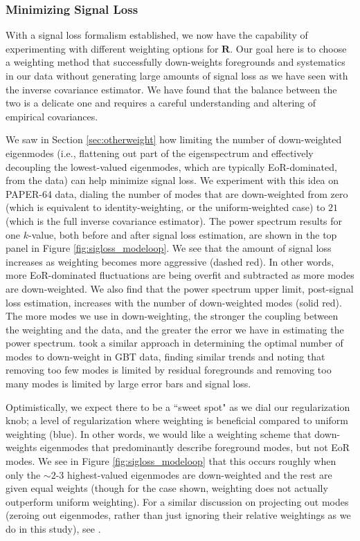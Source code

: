 \documentclass[preprint2,numberedappendix,tighten]{aastex6}  %
\begin{document}
\subsubsection{Minimizing Signal Loss}
\label{sec:Weight}

With a signal loss formalism established, we now have the capability of experimenting 
with different weighting options for $\textbf{R}$. Our goal here is to choose a weighting method that successfully down-weights 
foregrounds and systematics in our data without generating large amounts of signal loss as we have seen with the inverse covariance estimator. We have found that the balance 
between the two is a delicate one and requires a careful understanding and altering of empirical covariances. 

We saw in Section \ref{sec:otherweight} how limiting the number of down-weighted eigenmodes (i.e., flattening out part of the 
eigenspectrum and effectively decoupling the lowest-valued eigenmodes, which are typically EoR-dominated, from the data) can help minimize signal loss. We experiment with this idea on PAPER-64 data, dialing the number of modes 
that are down-weighted from zero (which is equivalent to identity-weighting, or the uniform-weighted case) to $21$ (which is the full inverse 
covariance estimator). The power spectrum results for one $k$-value, both before and after signal loss 
estimation, are shown in the top panel in Figure \ref{fig:sigloss_modeloop}. We see that the amount of signal loss increases as weighting 
becomes more aggressive (dashed red). In other words, more EoR-dominated fluctuations are being overfit and 
subtracted as more modes are down-weighted. We also find that the power spectrum upper limit, post-signal loss estimation, 
increases with the number of down-weighted modes (solid red). The more modes we use in down-weighting, the stronger the coupling between the weighting and the data, and the greater the error we have in estimating the power spectrum. \citet{switzer_et_al2013} took a similar approach in determining the optimal number of modes to down-weight in GBT data, finding similar trends and noting that removing too few modes is limited by residual foregrounds and removing too many modes is limited by large error bars and signal loss.

Optimistically, we expect there to be a ``sweet spot" as we dial our regularization knob; a level of regularization where weighting 
is beneficial compared to uniform weighting (blue). In other words, we would like a weighting scheme that down-weights eigenmodes that predominantly describe foreground modes, but not EoR modes. We see in Figure \ref{fig:sigloss_modeloop} that this occurs roughly when 
only the $\sim2$-$3$ highest-valued eigenmodes are down-weighted and the rest are given equal weights (though for the case shown, weighting does not actually outperform uniform weighting). For a similar discussion on projecting out modes (zeroing out eigenmodes, rather than just ignoring their relative weightings as we do in this study), see \citet{switzer_et_al2013}. 
\end{document}
